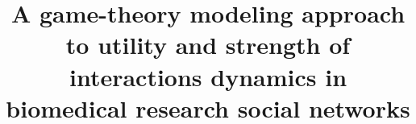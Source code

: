 \documentclass{bmcart}
\begin{document}
\begin{frontmatter}

\begin{fmbox}


\title{A game-theory modeling approach to utility and strength of interactions dynamics in biomedical research social networks}


\author[
   addressref={aff1,aff2},                   %
   corref={aff1},                       %
   noteref={n1},                        %
   email={jmario.siqueiros@iimas.unam.mx}   %
]{ }
\author[
   addressref={aff2},
   email={rgarcia@ie.unam.mx}
]{ }
\author[
   addressref={aff3},
   email={ehernandez@inmegen.mx}
]{ }
\author[
   addressref={aff3},
   email={sergio.alcala@ciencias.unam.mx}
]{ }




\address[id=aff1]{%
  , %
  ,                     %
  ,                              %
}
\address[id=aff2]{%
  ,
  ,
  ,
}
\address[id=aff3]{%
  ,
  ,
  ,
}


\end{fmbox}
\end{frontmatter}
\end{document}
